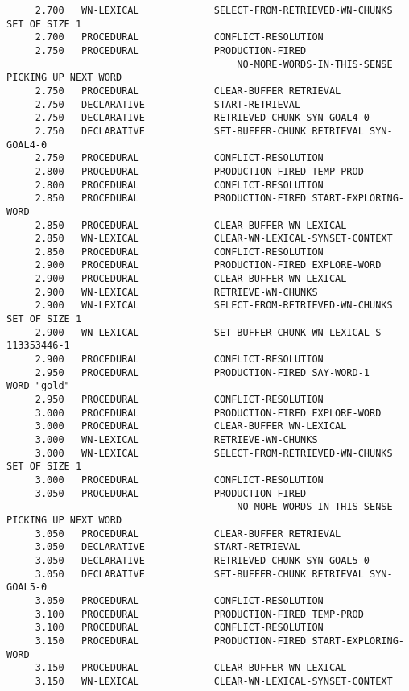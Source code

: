\begin{verbatim}
     2.700   WN-LEXICAL             SELECT-FROM-RETRIEVED-WN-CHUNKS SET OF SIZE 1 
     2.700   PROCEDURAL             CONFLICT-RESOLUTION 
     2.750   PROCEDURAL             PRODUCTION-FIRED 
                                        NO-MORE-WORDS-IN-THIS-SENSE 
PICKING UP NEXT WORD 
     2.750   PROCEDURAL             CLEAR-BUFFER RETRIEVAL 
     2.750   DECLARATIVE            START-RETRIEVAL 
     2.750   DECLARATIVE            RETRIEVED-CHUNK SYN-GOAL4-0 
     2.750   DECLARATIVE            SET-BUFFER-CHUNK RETRIEVAL SYN-GOAL4-0 
     2.750   PROCEDURAL             CONFLICT-RESOLUTION 
     2.800   PROCEDURAL             PRODUCTION-FIRED TEMP-PROD 
     2.800   PROCEDURAL             CONFLICT-RESOLUTION 
     2.850   PROCEDURAL             PRODUCTION-FIRED START-EXPLORING-WORD 
     2.850   PROCEDURAL             CLEAR-BUFFER WN-LEXICAL 
     2.850   WN-LEXICAL             CLEAR-WN-LEXICAL-SYNSET-CONTEXT 
     2.850   PROCEDURAL             CONFLICT-RESOLUTION 
     2.900   PROCEDURAL             PRODUCTION-FIRED EXPLORE-WORD 
     2.900   PROCEDURAL             CLEAR-BUFFER WN-LEXICAL 
     2.900   WN-LEXICAL             RETRIEVE-WN-CHUNKS 
     2.900   WN-LEXICAL             SELECT-FROM-RETRIEVED-WN-CHUNKS SET OF SIZE 1 
     2.900   WN-LEXICAL             SET-BUFFER-CHUNK WN-LEXICAL S-113353446-1 
     2.900   PROCEDURAL             CONFLICT-RESOLUTION 
     2.950   PROCEDURAL             PRODUCTION-FIRED SAY-WORD-1 
WORD "gold" 
     2.950   PROCEDURAL             CONFLICT-RESOLUTION 
     3.000   PROCEDURAL             PRODUCTION-FIRED EXPLORE-WORD 
     3.000   PROCEDURAL             CLEAR-BUFFER WN-LEXICAL 
     3.000   WN-LEXICAL             RETRIEVE-WN-CHUNKS 
     3.000   WN-LEXICAL             SELECT-FROM-RETRIEVED-WN-CHUNKS SET OF SIZE 1 
     3.000   PROCEDURAL             CONFLICT-RESOLUTION 
     3.050   PROCEDURAL             PRODUCTION-FIRED 
                                        NO-MORE-WORDS-IN-THIS-SENSE 
PICKING UP NEXT WORD 
     3.050   PROCEDURAL             CLEAR-BUFFER RETRIEVAL 
     3.050   DECLARATIVE            START-RETRIEVAL 
     3.050   DECLARATIVE            RETRIEVED-CHUNK SYN-GOAL5-0 
     3.050   DECLARATIVE            SET-BUFFER-CHUNK RETRIEVAL SYN-GOAL5-0 
     3.050   PROCEDURAL             CONFLICT-RESOLUTION 
     3.100   PROCEDURAL             PRODUCTION-FIRED TEMP-PROD 
     3.100   PROCEDURAL             CONFLICT-RESOLUTION 
     3.150   PROCEDURAL             PRODUCTION-FIRED START-EXPLORING-WORD 
     3.150   PROCEDURAL             CLEAR-BUFFER WN-LEXICAL 
     3.150   WN-LEXICAL             CLEAR-WN-LEXICAL-SYNSET-CONTEXT 

\end{verbatim}

